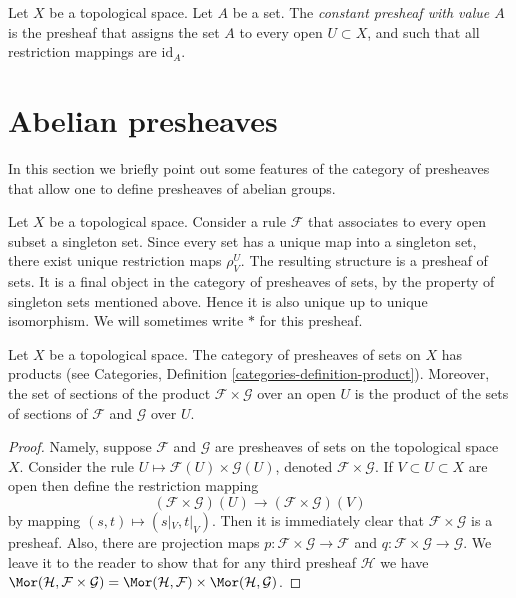 \begin{definition}
\label{definition-constant-presheaf}
Let $X$ be a topological space. Let $A$ be a set.
The {\it constant presheaf with value $A$} is the
presheaf that assigns the set $A$ to every open
$U \subset X$, and such that all restriction mappings
are $\text{id}_A$.
\end{definition}

\section{Abelian presheaves}
\label{section-abelian-presheaves}

\noindent
In this section we briefly point out some features of the
category of presheaves that allow one to define presheaves
of abelian groups.

\begin{example}
\label{example-singleton-presheaf}
Let $X$ be a topological space. Consider a rule $\mathcal{F}$ that
associates to every open subset a singleton set. Since every set
has a unique map into a singleton set, there exist unique restriction
maps $\rho^U_V$. The resulting structure is a presheaf of sets.
It is a final object in the category of presheaves of sets, by the
property of singleton sets mentioned above. Hence it is
also unique up to unique isomorphism. We will sometimes write $*$
for this presheaf.
\end{example}

\begin{lemma}
\label{lemma-product-presheaves}
Let $X$ be a topological space. The category of presheaves of sets
on $X$ has products (see
Categories, Definition \ref{categories-definition-product}).
Moreover, the set of
sections of the product $\mathcal{F} \times \mathcal{G}$
over an open $U$ is the product of the sets of sections of
$\mathcal{F}$ and $\mathcal{G}$ over $U$.
\end{lemma}

\begin{proof}
Namely, suppose $\mathcal{F}$ and $\mathcal{G}$ are
presheaves of sets on the topological space $X$.
Consider the rule $U \mapsto \mathcal{F}(U) \times \mathcal{G}(U)$,
denoted $\mathcal{F} \times \mathcal{G}$. If $V \subset U \subset X$
are open then define the restriction mapping
$$
(\mathcal{F} \times \mathcal{G})(U)
\longrightarrow
(\mathcal{F} \times \mathcal{G})(V)
$$
by mapping $(s, t) \mapsto (s|_V, t|_V)$. Then it is immediately
clear that $\mathcal{F} \times \mathcal{G}$ is a presheaf.
Also, there are projection maps
$p : \mathcal{F} \times \mathcal{G} \to \mathcal{F}$
and
$q : \mathcal{F} \times \mathcal{G} \to \mathcal{G}$.
We leave it to the reader to show that
for any third presheaf $\mathcal{H}$ we have
$\Mor(\mathcal{H}, \mathcal{F} \times \mathcal{G})
= \Mor(\mathcal{H}, \mathcal{F}) \times
\Mor(\mathcal{H}, \mathcal{G})$.
\end{proof}

